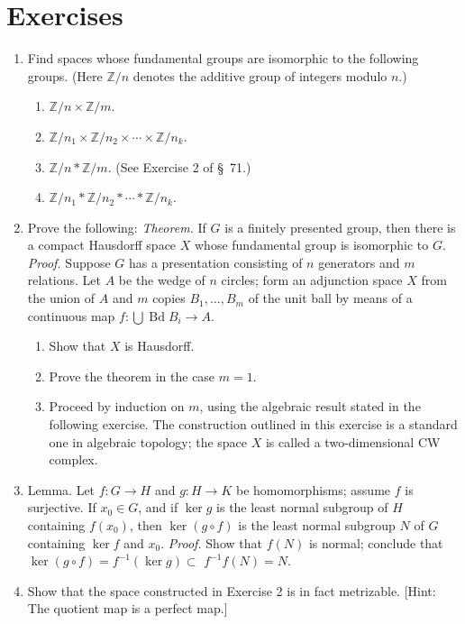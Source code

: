 \section*{Exercises}
\begin{enumerate}[itemsep=0.4em, parsep=0pt, topsep=0pt, partopsep=0pt, leftmargin=*, label=\arabic*., ref=\arabic*]
\item Find spaces whose fundamental groups are isomorphic to the following groups. (Here \(\mathbb{Z}/n\) denotes the additive group of integers modulo \(n\).)
 \begin{enumerate}[itemsep=0.2em, parsep=0pt, topsep=0pt, partopsep=0pt, leftmargin=*, label=(\alph*), align=left]
 \item \(\mathbb{Z}/n \times \mathbb{Z}/m\).
 \item \(\mathbb{Z}/n_{1} \times \mathbb{Z}/n_{2} \times \cdots \times \mathbb{Z}/n_{k}\).
 \item \(\mathbb{Z}/n * \mathbb{Z}/m\). (See Exercise 2 of \S\ 71.)
 \item \(\mathbb{Z}/n_{1} * \mathbb{Z}/n_{2} * \cdots * \mathbb{Z}/n_{k}\).
 \end{enumerate}
\item Prove the following: \textsl{Theorem.} If \(G\) is a finitely presented group, then there is a compact Hausdorff space \(X\) whose fundamental group is isomorphic to \(G\). \textsl{Proof.} Suppose \(G\) has a presentation consisting of \(n\) generators and \(m\) relations. Let \(A\) be the wedge of \(n\) circles; form an adjunction space \(X\) from the union of \(A\) and \(m\) copies \(B_{1},\ldots ,B_{m}\) of the unit ball by means of a continuous map \(f : \bigcup \operatorname{Bd}B_{i} \rightarrow A\).
 \begin{enumerate}[itemsep=0.2em, parsep=0pt, topsep=0pt, partopsep=0pt, leftmargin=*, label=(\alph*), align=left]
 \item Show that \(X\) is Hausdorff.
 \item Prove the theorem in the case \(m = 1\).
 \item Proceed by induction on \(m\), using the algebraic result stated in the following exercise. The construction outlined in this exercise is a standard one in algebraic topology; the space \(X\) is called a two-dimensional CW complex.
 \end{enumerate}
\item Lemma. Let \(f : G \rightarrow H\) and \(g : H \rightarrow K\) be homomorphisms; assume \(f\) is surjective. If \(x_{0} \in G\), and if \(\ker g\) is the least normal subgroup of \(H\) containing \(f( x_{0})\), then \(\ker ( {g \circ f})\) is the least normal subgroup \(N\) of \(G\) containing \(\ker f\) and \(x_{0}\). \textsl{Proof.} Show that \(f( N)\) is normal; conclude that \(\ker ( {g \circ f}) = f^{-1}( {\ker g}) \subset\) \(f^{-1}f( N) = N.\) 
\item Show that the space constructed in Exercise 2 is in fact metrizable. [Hint: The quotient map is a perfect map.]
\end{enumerate}